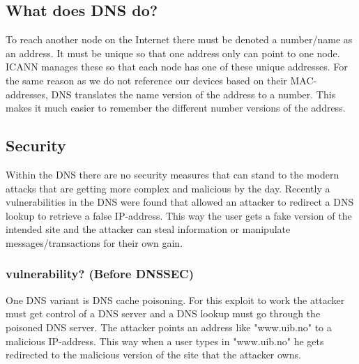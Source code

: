 \documentclass{article}
\begin{document}
		\subsection{What does DNS do?}
		To reach another node on the Internet there must be denoted a number/name as an address. It must be unique so that one address only can point to one node.\\
		ICANN manages these so that each node has one of these unique addresses. For the same reason as we do not reference our devices based on their MAC-addresses, DNS translates the name version of the address to a number. This makes it much easier to remember the different number versions of the address.
		\subsection{Security}
		Within the DNS there are no security measures that can stand to the modern attacks that are getting more complex and malicious by the day. Recently a vulnerabilities in the DNS were found that allowed an attacker to redirect a DNS lookup to retrieve a false IP-address. This way the user gets a fake version of the intended site and the attacker can steal information or manipulate messages/transactions for their own gain.
	        \subsubsection{vulnerability? (Before DNSSEC)}
	        One DNS variant is DNS cache poisoning. For this exploit to work the attacker must get control of a DNS server and a DNS lookup must go through the poisoned DNS server. The attacker points an address like "www.uib.no" to a malicious IP-address. This way when a user types in "www.uib.no" he gets redirected to the malicious version of the site that the attacker owns.\cite{bellovin}
\end{document}
